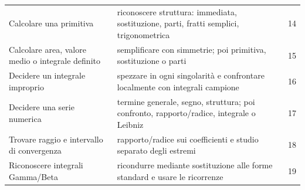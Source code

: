 \begin{longtable}{@{}p{}p{}p{}@{}}
Calcolare una primitiva & riconoscere struttura: immediata, sostituzione, parti, fratti semplici, trigonometrica & 14\\
Calcolare area, valore medio o integrale definito & semplificare con simmetrie; poi primitiva, sostituzione o parti & 15\\
Decidere un integrale improprio & spezzare in ogni singolarità e confrontare localmente con integrali campione & 16\\
Decidere una serie numerica & termine generale, segno, struttura; poi confronto, rapporto/radice, integrale o Leibniz & 17\\
Trovare raggio e intervallo di convergenza & rapporto/radice sui coefficienti e studio separato degli estremi & 18\\
Riconoscere integrali Gamma/Beta & ricondurre mediante sostituzione alle forme standard e usare le ricorrenze & 19\\
\bottomrule
\end{longtable}

